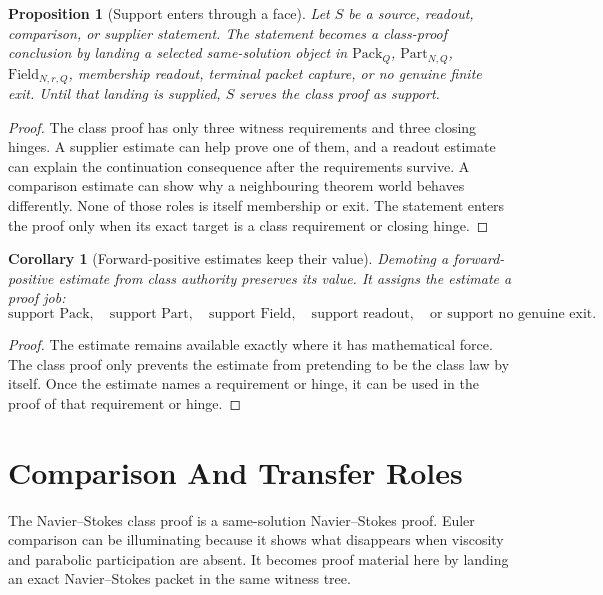 \documentclass[11pt]{article}
\newtheorem{proposition}{Proposition}
\newtheorem{corollary}{Corollary}
\newcommand{\Pack}{\mathrm{Pack}}
\newcommand{\Part}{\mathrm{Part}}
\newcommand{\Field}{\mathrm{Field}}
\begin{document}
\begin{proposition}[Support enters through a face]
Let \(S\) be a source, readout, comparison, or supplier statement.
The statement becomes a class-proof conclusion by landing a selected same-solution object in \(\Pack_Q\), \(\Part_{N,Q}\), \(\Field_{N,r,Q}\), membership readout, terminal packet capture, or no genuine finite exit.
Until that landing is supplied, \(S\) serves the class proof as support.
\end{proposition}

\begin{proof}
The class proof has only three witness requirements and three closing hinges.
A supplier estimate can help prove one of them, and a readout estimate can explain the continuation consequence after the requirements survive.
A comparison estimate can show why a neighbouring theorem world behaves differently.
None of those roles is itself membership or exit.
The statement enters the proof only when its exact target is a class requirement or closing hinge.
\end{proof}

\begin{corollary}[Forward-positive estimates keep their value]
Demoting a forward-positive estimate from class authority preserves its value.
It assigns the estimate a proof job:
\[
  \text{support Pack},\quad
  \text{support Part},\quad
  \text{support Field},\quad
  \text{support readout},\quad
  \text{or support no genuine exit}.
\]
\end{corollary}

\begin{proof}
The estimate remains available exactly where it has mathematical force.
The class proof only prevents the estimate from pretending to be the class law by itself.
Once the estimate names a requirement or hinge, it can be used in the proof of that requirement or hinge.
\end{proof}

\section{Comparison And Transfer Roles}

The Navier--Stokes class proof is a same-solution Navier--Stokes proof.
Euler comparison can be illuminating because it shows what disappears when viscosity and parabolic participation are absent.
It becomes proof material here by landing an exact Navier--Stokes packet in the same witness tree.
\end{document}
